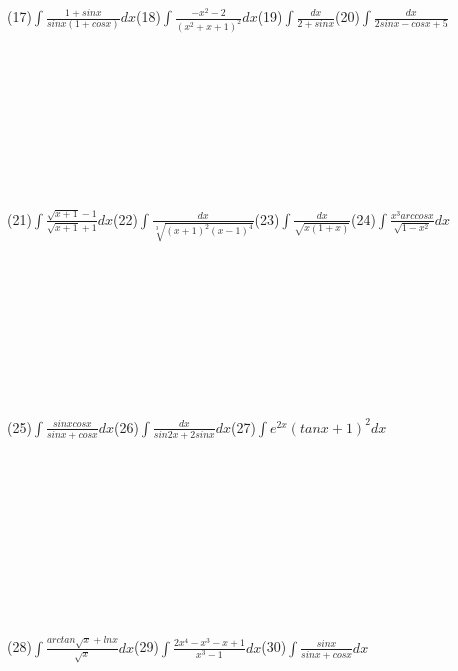 \documentclass[UTF8]{ctexart}
\begin{document}
   (17)$\displaystyle{\int \frac{1+sinx}{sinx(1+cosx)}dx}$\quad \quad\quad (18)$\displaystyle{\int \frac{-x^2-2}{(x^2+x+1)^2}dx}$\quad\quad\quad(19)$\displaystyle{\int \frac{dx}{2+sinx}}$\quad\quad\quad(20)$\displaystyle{\int \frac{dx}{2sinx-cosx+5}}$
   \\ \\ \\ \\ \\ \\ \\ \\ \\ \\
   (21)$\displaystyle{\int \frac{\sqrt{x+1}-1}{\sqrt{x+1}+1}dx}$\quad\quad\quad(22)$\displaystyle{\int \frac{dx}{\sqrt[3]{(x+1)^2(x-1)^4}}}$\quad\quad\quad(23)$\displaystyle{\int \frac{dx}{\sqrt{x(1+x)}}}$\quad\quad\quad(24)$\displaystyle{\int \frac{x^3arccosx}{\sqrt{1-x^2}}dx}$
   \\ \\ \\ \\ \\ \\ \\ \\ \\ \\
   (25)$\displaystyle{\int \frac{sinxcosx}{sinx+cosx}dx}$\quad\quad\quad(26)$\displaystyle{\int \frac{dx}{sin2x+2sinx}dx}$\quad\quad\quad(27)$\displaystyle{\int  e^{2x}(tanx+1)^2dx}$
   \\ \\ \\ \\ \\ \\ \\ \\ \\ \\ \\
   (28)$\displaystyle{\int \frac{arctan\sqrt{x}+lnx}{\sqrt{x}}dx}$\quad\quad\quad\quad\quad\quad(29)$\displaystyle{\int \frac{2x^4-x^3-x+1}{x^3-1}dx }$\quad\quad\quad(30)$\displaystyle{\int \frac{sinx}{sinx+cosx}dx}$
    
\end{document}
